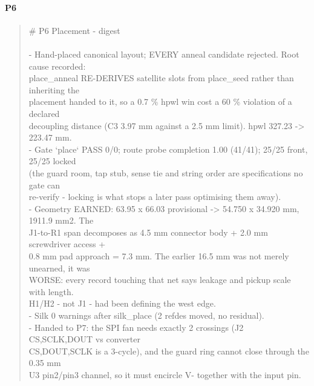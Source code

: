 \documentclass[11pt,a4paper]{article}
\begin{document}
\paragraph*{P6}
\begin{quote}\small\ttfamily\raggedright
\# P6 Placement - digest\\
~\\
- Hand-placed canonical layout; EVERY anneal candidate rejected. Root cause recorded:\\
  place\_anneal RE-DERIVES satellite slots from place\_seed rather than inheriting the\\
  placement handed to it, so a 0.7 \% hpwl win cost a 60 \% violation of a declared\\
  decoupling distance (C3 3.97 mm against a 2.5 mm limit). hpwl 327.23 -\textgreater{} 223.47 mm.\\
- Gate `place` PASS 0/0; route probe completion 1.00 (41/41); 25/25 front, 25/25 locked\\
  (the guard room, tap stub, sense tie and string order are specifications no gate can\\
  re-verify - locking is what stops a later pass optimising them away).\\
- Geometry EARNED: 63.95 x 66.03 provisional -\textgreater{} 54.750 x 34.920 mm, 1911.9 mm2. The\\
  J1-to-R1 span decomposes as 4.5 mm connector body + 2.0 mm screwdriver access +\\
  0.8 mm pad approach = 7.3 mm. The earlier 16.5 mm was not merely unearned, it was\\
  WORSE: every record touching that net says leakage and pickup scale with length.\\
  H1/H2 - not J1 - had been defining the west edge.\\
- Silk 0 warnings after silk\_place (2 refdes moved, no residual).\\
- Handed to P7: the SPI fan needs exactly 2 crossings (J2 CS,SCLK,DOUT vs converter\\
  CS,DOUT,SCLK is a 3-cycle), and the guard ring cannot close through the 0.35 mm\\
  U3 pin2/pin3 channel, so it must encircle V- together with the input pin.
\end{quote}
\end{document}
